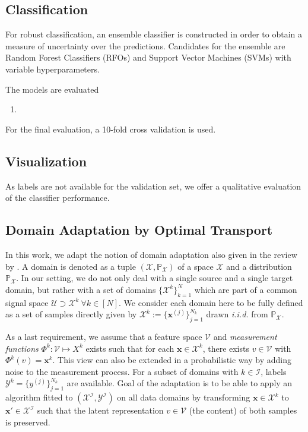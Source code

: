 \documentclass[10pt,a4paper]{article}
\newcommand{\xx}{\mathbf{x}}
\newcommand{\X}{\mathcal{X}}
\newcommand{\Y}{\mathcal{Y}}
\newcommand{\U}{\mathcal{U}}
\newcommand{\V}{\mathcal{V}}
\newcommand{\I}{\mathcal{I}}
\renewcommand{\P}{\mathds{P}}
\begin{document}
\subsection{Classification}

For robust classification, an ensemble classifier is constructed in order to obtain a measure of uncertainty over the predictions.
Candidates for the ensemble are Random Forest Classifiers (RFOs) and Support Vector Machines (SVMs) with variable hyperparameters.

The models are evaluated

\begin{enumerate}
    \item
\end{enumerate}

For the final evaluation, a 10-fold cross validation is used.


\subsection{Visualization}

As labels are not available for the validation set, we offer a qualitative evaluation of the classifier performance.

\subsection{Domain Adaptation by Optimal Transport}
In this work, we adapt the notion of domain adaptation also given in the review by \cite{Pan}.
A domain is denoted as a tuple $(\X, \P_{\X})$ of a space $\X$ and a distribution $\P_{\X}$.
In our setting, we do not only deal with a single source and a single target domain, but rather with a set of domains $\{ \X^k \}_{k=1}^N$ which are part of a common signal space $\U \supset \X^k\ \forall k \in [N]$.
We consider each domain here to be fully defined as a set of samples directly given by $\X^k := \{\xx^{(j)}\}_{j=1}^{N_k}$ drawn \emph{i.i.d.} from $\P_{\X}$.

As a last requirement, we assume that a feature space $\V$ and \emph{measurement functions} $\Phi^k: \V \mapsto X^k$ exists such that for each $\xx \in \X^k$, there exists $v \in \V$ with $\Phi^k(v) = \xx^k$.
This view can also be extended in a probabilistic way by adding noise to the measurement process.
For a subset of domains with $k \in \I$, labels $\Y^k = \{y^{(j)}\}_{j=1}^{N_k}$ are available.
Goal of the adaptation is to be able to apply an algorithm fitted to $(\X^\I, \Y^\I)$ on all data domains by transforming $\xx \in \X^k$ to $\xx' \in \X^\I$ such that the latent representation $v \in \V$ (the content) of both samples is preserved.
\end{document}
